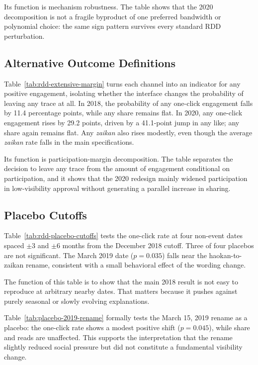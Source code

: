 \documentclass[12pt, american]{article}
\begin{document}
Its function is mechanism robustness. The table shows that the 2020 decomposition is not a fragile byproduct of one preferred bandwidth or polynomial choice: the same sign pattern survives every standard RDD perturbation.



\subsection{Alternative Outcome Definitions}

Table~\ref{tab:rdd-extensive-margin} turns each channel into an indicator for any positive engagement, isolating whether the interface changes the probability of leaving any trace at all. In 2018, the probability of any one-click engagement falls by 11.4 percentage points, while any share remains flat. In 2020, any one-click engagement rises by 29.2 points, driven by a 41.1-point jump in any like; any share again remains flat. Any \textit{zaikan} also rises modestly, even though the average \textit{zaikan} rate falls in the main specifications.

Its function is participation-margin decomposition. The table separates the decision to leave any trace from the amount of engagement conditional on participation, and it shows that the 2020 redesign mainly widened participation in low-visibility approval without generating a parallel increase in sharing.



\subsection{Placebo Cutoffs}

Table~\ref{tab:rdd-placebo-cutoffs} tests the one-click rate at four non-event dates spaced $\pm$3 and $\pm$6 months from the December 2018 cutoff. Three of four placebos are not significant. The March 2019 date ($p = 0.035$) falls near the haokan-to-zaikan rename, consistent with a small behavioral effect of the wording change.

The function of this table is to show that the main 2018 result is not easy to reproduce at arbitrary nearby dates. That matters because it pushes against purely seasonal or slowly evolving explanations.



Table~\ref{tab:placebo-2019-rename} formally tests the March 15, 2019 rename as a placebo: the one-click rate shows a modest positive shift ($p = 0.045$), while share and reads are unaffected. This supports the interpretation that the rename slightly reduced social pressure but did not constitute a fundamental visibility change.
\end{document}
